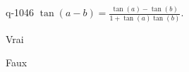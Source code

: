 \begin{truefalse}{q-1046}
$\tan(a-b)=\frac{\tan(a) - \tan(b)}{1+\tan(a)\tan(b)}$.
\item* Vrai
\item Faux
\end{truefalse}

